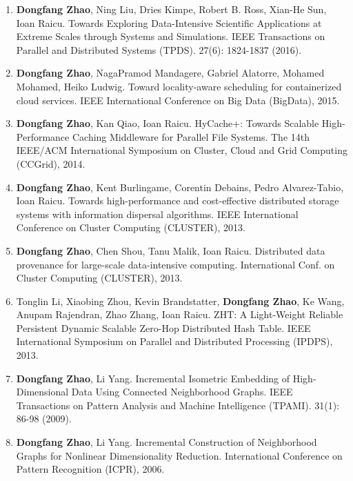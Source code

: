 \documentclass[11pt,]{scrartcl}
\begin{document}
\begin{enumerate}
\item \textbf{Dongfang Zhao}, Ning Liu, Dries Kimpe, Robert B. Ross, Xian-He Sun, Ioan Raicu.
Towards Exploring Data-Intensive Scientific Applications at Extreme Scales through Systems and Simulations. IEEE Transactions on Parallel and Distributed Systems (TPDS). 27(6): 1824-1837 (2016).


\item \textbf{Dongfang Zhao}, NagaPramod Mandagere, Gabriel Alatorre, Mohamed Mohamed, Heiko Ludwig.
Toward locality-aware scheduling for containerized cloud services. 
IEEE International Conference on Big Data (BigData), 2015.

\item \textbf{Dongfang Zhao}, Kan Qiao, Ioan Raicu.
HyCache+: Towards Scalable High-Performance Caching Middleware for Parallel File Systems. 
The 14th IEEE/ACM International Symposium on Cluster, Cloud and Grid Computing (CCGrid), 2014.

\item \textbf{Dongfang Zhao}, Kent Burlingame, Corentin Debains, Pedro Alvarez-Tabio, Ioan Raicu.
Towards high-performance and cost-effective distributed storage systems with information dispersal algorithms. 
IEEE International Conference on Cluster Computing (CLUSTER), 2013.

\item 	\textbf{Dongfang Zhao}, Chen Shou, Tanu Malik, Ioan Raicu.
Distributed data provenance for large-scale data-intensive computing. 
International Conf. on Cluster Computing \mbox{(CLUSTER)}, 2013.

\item Tonglin Li, Xiaobing Zhou, Kevin Brandstatter, \textbf{Dongfang Zhao}, Ke Wang, Anupam Rajendran, Zhao Zhang, Ioan Raicu.
ZHT: A Light-Weight Reliable Persistent Dynamic Scalable Zero-Hop Distributed Hash Table. 
IEEE International Symposium on Parallel and Distributed Processing (IPDPS), 2013.

\item \textbf{Dongfang Zhao}, Li Yang.
Incremental Isometric Embedding of High-Dimensional Data Using Connected Neighborhood Graphs. IEEE Transactions on Pattern Analysis and Machine Intelligence (TPAMI). 31(1): 86-98 (2009).


\item \textbf{Dongfang Zhao}, Li Yang.
Incremental Construction of Neighborhood Graphs for Nonlinear Dimensionality Reduction. 
International Conference on Pattern Recognition (ICPR), 2006.

\end{enumerate}
\end{document}

